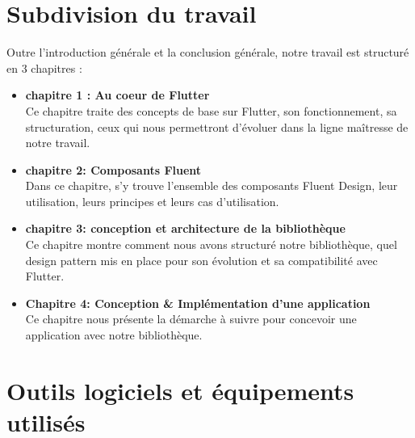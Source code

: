 \documentclass[a4paper,12pt]{report}
\begin{document}
                
            \section*{Subdivision du travail}
                Outre l’introduction générale et la conclusion générale, 
                notre travail est structuré en 3 chapitres :
                \begin{itemize}
                    \item \textbf{chapitre 1 : Au coeur de Flutter}
                    \\
                        Ce chapitre traite des concepts de base sur Flutter, son fonctionnement, sa structuration,  
                        ceux qui nous permettront
                        d’évoluer dans la ligne maîtresse de notre travail.
                    

                    \item \textbf{chapitre 2: Composants Fluent}
                    \\
                        Dans ce chapitre, s'y trouve l'ensemble des composants Fluent Design,
                        leur utilisation, leurs principes et leurs cas d'utilisation.
                    
                    
                    \item \textbf{chapitre 3: conception et architecture de la bibliothèque}
                    \\
                        Ce chapitre montre comment nous avons structuré notre bibliothèque,
                        quel design pattern mis en place pour son évolution et sa compatibilité avec Flutter.
                    
                    
                    \item \textbf{Chapitre 4: Conception & Implémentation d'une application }
                    \\
                        Ce chapitre nous présente la démarche à suivre pour concevoir une
                        application avec notre bibliothèque.
                        
                \end{itemize}
            
            \section*{Outils logiciels et équipements utilisés}
\end{document}
